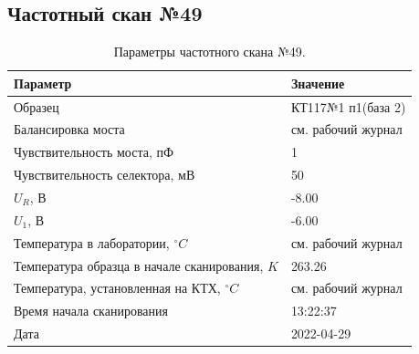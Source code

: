 \subsection{Частотный скан №49}
\begin{table}[!ht]
    \centering
    \caption{Параметры частотного скана №49.}
    \begin{tabular}{|l|l|}
        \hline
        Параметр                                       & Значение                  \\ \hline
        Образец                                        & КТ117№1 п1(база 2)        \\ \hline
        Балансировка моста                             & см. рабочий журнал        \\ \hline
        Чувствительность моста, пФ                     & 1                         \\ \hline
        Чувствительность селектора, мВ                 & 50                        \\ \hline
        $U_R$, В                                       & -8.00                     \\ \hline
        $U_1$, В                                       & -6.00                     \\ \hline
        Температура в лаборатории, $^\circ C$          & см. рабочий журнал        \\ \hline
        Температура образца в начале сканирования, $K$ & 263.26                    \\ \hline
        Температура, установленная на КТХ, $^\circ C$  & см. рабочий журнал        \\ \hline
        Время начала сканирования                      & 13:22:37                  \\ \hline
        Дата                                           & 2022-04-29                \\ \hline
    \end{tabular}
    \label{table:frequency_scan_49}
\end{table}

